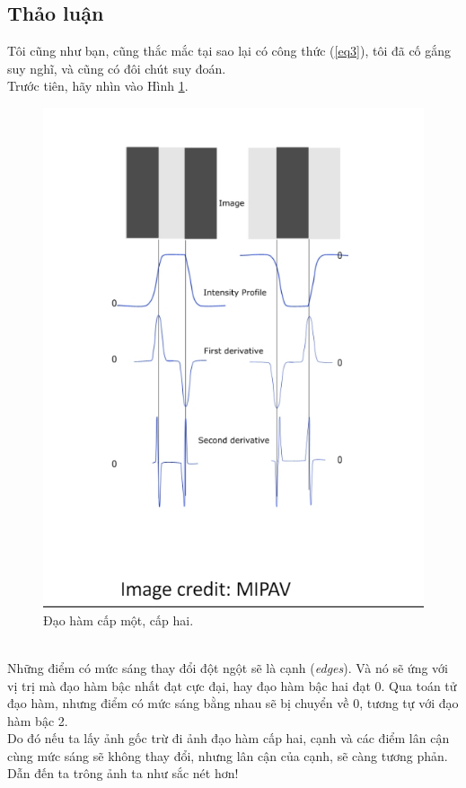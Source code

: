 \documentclass{article}
\begin{document}
    \subsection{Thảo luận}
    Tôi cũng như bạn, cũng thắc mắc tại sao lại có công thức (\ref{eq3}), tôi đã cố gắng suy nghĩ, và cũng có đôi chút suy đoán.\\
    Trước tiên, hãy nhìn vào Hình \ref{fig14}.
    \begin{figure}[ht!]
        \centering
        \includegraphics[width =0.9\linewidth]{download (6).png}
        \caption{Đạo hàm cấp một, cấp hai.}
        \label{fig14}
    \end{figure}
    \\ Những điểm có mức sáng thay đổi đột ngột sẽ là cạnh (\textit{edges}). Và nó sẽ ứng với vị trị mà đạo hàm bậc nhất đạt cực đại, hay đạo hàm bậc hai đạt 0. Qua toán tử đạo hàm, nhưng điểm có mức sáng bằng nhau sẽ bị chuyển về 0, tương tự với đạo hàm bậc 2.
    \\ Do đó nếu ta lấy ảnh gốc trừ đi ảnh đạo hàm cấp hai, cạnh và các điểm lân cận cùng mức sáng sẽ không thay đổi, nhưng lân cận của cạnh, sẽ càng tương phản. Dẫn đến ta trông ảnh ta như sắc nét hơn!
\end{document}
